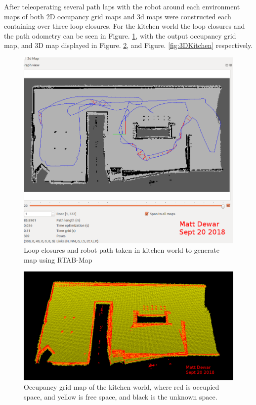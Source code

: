 \documentclass[10pt,journal,compsoc]{IEEEtran}
\begin{document}
After teleoperating several path laps with the robot around each environment maps of both 2D occupancy grid maps and 3d maps were constructed each containing over three loop closures. For the kitchen world the loop closures and the path odometry can be seen in Figure. \ref{fig:loopclosureKitchen}, with the output occupancy grid map, and 3D map displayed in Figure. \ref{fig:occupancyKitchen}, and Figure. \ref{fig:3DKitchen} respectively.

\begin{figure}[thpb]
      \centering
      \includegraphics[width=\linewidth]{../img/loop_closure_kitchen2.png}
      \caption{Loop closures and robot path taken in kitchen world to generate map using RTAB-Map}
      \label{fig:loopclosureKitchen}
\end{figure}

\begin{figure}[thpb]
      \centering
      \includegraphics[width=\linewidth]{../img/kitchen_occupancy_map.png}
      \caption{Occupancy grid map of the kitchen world, where red is occupied space, and yellow is free space, and black is the unknown space.}
      \label{fig:occupancyKitchen}
\end{figure}
\end{document}
